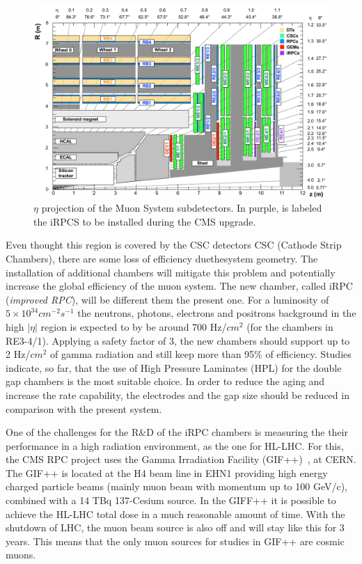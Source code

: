 \begin{figure}[h]
\begin{center}
\includegraphics[width=1.0\textwidth,keepaspectratio]{figures_and_tables/rpc/muon_eta.png}
\end{center}
\caption{$\eta$ projection of the Muon System subdetectors. In purple, is labeled the iRPCS to be installed during the CMS upgrade.}\label{muons_eta}
\end{figure}

Even thought this region is covered by the CSC detectors CSC (Cathode Strip Chambers), there are some loss of efficiency duethesystem geometry. The installation of additional chambers will mitigate this problem and potentially increase the global efficiency of the muon system. The new chamber, called iRPC (\textit{improved RPC}), will be different them the present one. For a luminosity of $5 \times 10^{34} cm^{-2} s^{-1}$  the neutrons, photons, electrons and positrons background in the high $|\eta|$ region is expected to by be around 700 Hz/$cm^{2}$ (for the chambers in RE3-4/1). Applying a safety factor of 3, the new chambers should support up to 2 Hz/$cm^{2}$ of gamma radiation and still keep more than 95\% of efficiency. Studies indicate, so far, that the use of High Pressure Laminates (HPL) for the double gap chambers is the most suitable choice. In order to reduce the aging and increase the rate capability, the electrodes and the gap size should be reduced in comparison with the present system.

One of the challenges for the R\&D of the iRPC chambers is measuring the their performance in a high radiation environment, as the one for HL-LHC. For this, the CMS RPC project uses the Gamma Irradiation Facility (GIF++)~\cite{gifpp}, at CERN. The GIF++ is located at the H4 beam line in EHN1 providing high energy charged particle beams (mainly muon beam with momentum up to 100 GeV/c), combined with a 14 TBq 137-Cesium source. In the GIFF++ it is possible to achieve the HL-LHC total dose in a much reasonable amount of time. With the shutdown of LHC, the muon beam source is also off and will stay like this for 3 years. This means that the only muon sources for studies in GIF++ are cosmic muons. 


